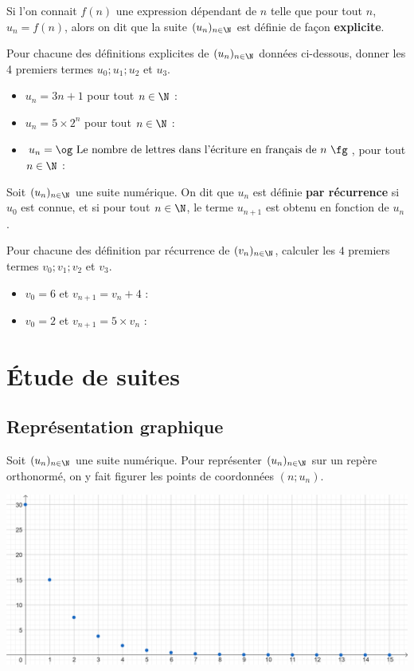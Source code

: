 \documentclass{article}
\begin{document}
\begin{definition}
Si l'on connait $f(n)$ une expression dépendant de $n$ telle que pour tout $n$, $u_n = f(n)$, alors on dit que la suite $(u_n)_{n \in \N}$ est définie de façon \textbf{explicite}.
\end{definition}
\begin{example}
Pour chacune des définitions explicites de $(u_n)_{n \in \N}$ données ci-dessous, donner les 4 premiers termes $u_0; u_1; u_2$ et $u_3$.
\begin{itemize}
\item $u_n = 3n + 1$ pour tout $n \in \N$ : \answersline
\item $u_n = 5 \times 2^n$ pour tout $n \in \N$ : \answersline
\item $u_n = \text{\og Le nombre de lettres dans l'écriture en français de $n$ \fg}$, pour tout $n \in \N$ : \answersline
\end{itemize}
\end{example}
\begin{tcolorbox}
\begin{definition}
Soit $(u_n)_{n \in \N}$ une suite numérique. On dit que $u_n$ est définie \textbf{par récurrence} si $u_0$ est connue, et si pour tout $n \in \N$, le terme $u_{n+1}$ est obtenu en fonction de $u_n$.  
\end{definition}
\end{tcolorbox}
\begin{example}
Pour chacune des définition par récurrence de $(v_n)_{n \in \N}$, calculer les $4$ premiers termes $v_0; v_1; v_2$ et $v_3$.
\begin{itemize}
\item $v_0 = 6$ et $v_{n+1} = v_n + 4$ : \answersline
\item $v_0 = 2$ et $v_{n+1} = 5 \times v_n$ : \answersline 
\end{itemize}
\end{example}
\newpage
\section{Étude de suites}
\subsection{Représentation graphique}
Soit $(u_n)_{n \in \N}$ une suite numérique. Pour représenter $(u_n)_{n \in \N}$ sur un repère orthonormé, on y fait figurer les points de coordonnées $(n;u_n)$.
\begin{center}
\includegraphics[width=\textwidth]{Repr_suite.png}
\end{center}
\end{document}
